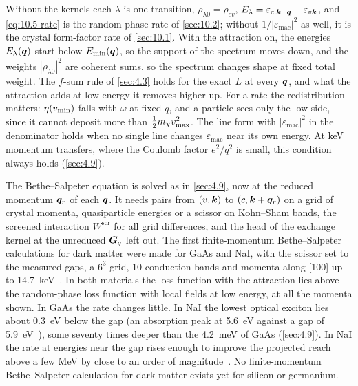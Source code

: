 \noindent Without the kernels each $\lambda$ is one transition, $\rho_{\lambda0} = \rho_{cv}$, $E_\lambda = \varepsilon_{c,\bm{k}+\bm{q}} - \varepsilon_{v\bm{k}}$, and \cref{eq:10.5-rate} is the random-phase rate of \cref{sec:10.2}; without $1/|\varepsilon_{\mathrm{mac}}|^2$ as well, it is the crystal form-factor rate of \cref{sec:10.1}. With the attraction on, the energies $E_\lambda(\bm{q})$ start below $E_{\mathrm{min}}(\bm{q})$, so the support of the spectrum moves down, and the weights $|\rho_{\lambda0}|^2$ are coherent sums, so the spectrum changes shape at fixed total weight. The $f$-sum rule of \cref{sec:4.3} holds for the exact $L$ at every $\bm{q}$, and what the attraction adds at low energy it removes higher up. For a rate the redistribution matters: $\eta(v_{\mathrm{min}})$ falls with $\omega$ at fixed $q$, and a particle sees only the low side, since it cannot deposit more than $\tfrac12m_{\chi} v_{\mathrm{max}}^2$. The line form with $|\varepsilon_{\mathrm{mac}}|^2$ in the denominator holds when no single line changes $\varepsilon_{\mathrm{mac}}$ near its own energy. At keV momentum transfers, where the Coulomb factor $e^2/q^2$ is small, this condition always holds (\cref{sec:4.9}).

The Bethe--Salpeter equation is solved as in \cref{sec:4.9}, now at the reduced momentum $\bm{q}_r$ of each $\bm{q}$. It needs pairs from $(v,\bm{k})$ to $(c,\bm{k}+\bm{q}_r)$ on a grid of crystal momenta, quasiparticle energies or a scissor on Kohn--Sham bands, the screened interaction $W^{\mathrm{scr}}$ for all grid differences, and the head of the exchange kernel at the unreduced $\bm{G}_q$ left out. The first finite-momentum Bethe--Salpeter calculations for dark matter were made for GaAs and NaI, with the scissor set to the measured gaps, a $6^3$ grid, 10 conduction bands and momenta along [100] up to \SI{14.7}{keV}~\cite{taufertshofer2026excitonic}. In both materials the loss function with the attraction lies above the random-phase loss function with local fields at low energy, at all the momenta shown. In GaAs the rate changes little. In NaI the lowest optical exciton lies about \SI{0.3}{eV} below the gap (an absorption peak at \SI{5.6}{eV} against a gap of \SI{5.9}{eV}~\cite{taufertshofer2026excitonic}), some seventy times deeper than the \SI{4.2}{meV} of GaAs (\cref{sec:4.9}). In NaI the rate at energies near the gap rises enough to improve the projected reach above a few MeV by close to an order of magnitude~\cite{taufertshofer2026excitonic}. No finite-momentum Bethe--Salpeter calculation for dark matter exists yet for silicon or germanium.

